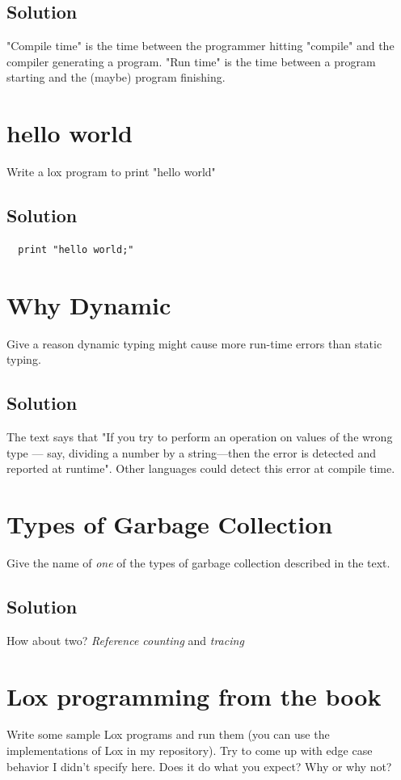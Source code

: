 \documentclass[twoside=false, DIV=14]{scrartcl}
\begin{document}
\subsection*{Solution}
"Compile time" is the time between the programmer hitting "compile" and the compiler generating a program. "Run time" is the time between a program starting and the (maybe) program finishing.

\section*{hello world}
  Write a lox program to print "hello world"

\subsection*{Solution}
\begin{lstlisting}
  print "hello world;"  
\end{lstlisting}

\section*{Why Dynamic}
Give a reason dynamic typing might cause more run-time errors than static typing.

\subsection*{Solution}
The text says that "If you try to perform an operation on values of the wrong type — say, dividing a number by a string—then the error is detected and reported at runtime". Other languages could detect this error at compile time.

\section*{Types of Garbage Collection}
Give the name of \emph{one} of the types of garbage collection described in the text.

\subsection*{Solution}
How about two?  \emph{Reference counting} and \emph{tracing}

\section*{Lox programming from the book}
Write some sample Lox programs and run them (you can use the implementations of Lox in my repository). Try to come up with edge case behavior I didn’t specify here. Does it do what you expect? Why or why not?
\end{document}
